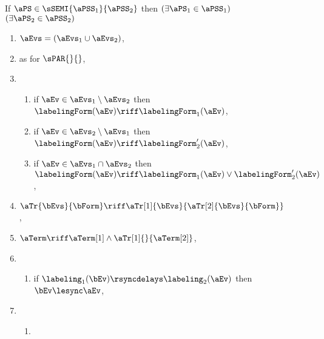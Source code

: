 \begin{figure}
  \noindent
  If $\aPS \in \sSEMI{\aPSS_1}{\aPSS_2}$ then
  $(\exists\aPS_1\in\aPSS_1)$ $(\exists\aPS_2\in\aPSS_2)$
  \begin{multicols}{2}
    \begin{enumerate}[topsep=0pt,label=(\textsc{s}\arabic*),ref=\textsc{s}\arabic*]
    \item \label{seq-E}
      $\aEvs = (\aEvs_1\cup\aEvs_2)$,
    \item \label{seq-lambda}
       as for $\sPAR{}{}$,
    \item[] \setcounter{enumi}{\value{kappa}} 
      \begin{enumerate}[leftmargin=0pt]
      \item \label{seq-kappa1}
        if $\aEv\in\aEvs_1\setminus\aEvs_2$ then $\labelingForm(\aEv) \riff \labelingForm_1(\aEv)$,
      \item \label{seq-kappa2}
        if $\aEv\in\aEvs_2\setminus\aEvs_1$ then $\labelingForm(\aEv) \riff \labelingForm'_2(\aEv)$,%
      \item \label{seq-kappa12}
        if $\aEv\in\aEvs_1\cap\aEvs_2$ then $\labelingForm(\aEv) \riff \labelingForm_1(\aEv)\lor\labelingForm'_2(\aEv)$,%
      \end{enumerate}
    \item \label{seq-tau}
      $\aTr{\bEvs}{\bForm} \riff \aTr[1]{\bEvs}{\aTr[2]{\bEvs}{\bForm}}$,
    \item \label{seq-term}
      $\aTerm \riff \aTerm[1]\land\aTr[1]{}{\aTerm[2]}$,
    \item[] \setcounter{enumi}{\value{lesync}}
      \begin{enumerate}[leftmargin=0pt]
      \item \label{seq-delay-sync}
        if $\labeling_1(\bEv)\rsyncdelays\labeling_2(\aEv)$
        then $\bEv\lesync\aEv$,
      \end{enumerate}
    \item[] \setcounter{enumi}{\value{leloc}}
      \begin{enumerate}[leftmargin=0pt]
      \item \label{seq-delay-co}

\end{enumerate}
\end{enumerate}
\end{multicols}
\end{figure}
